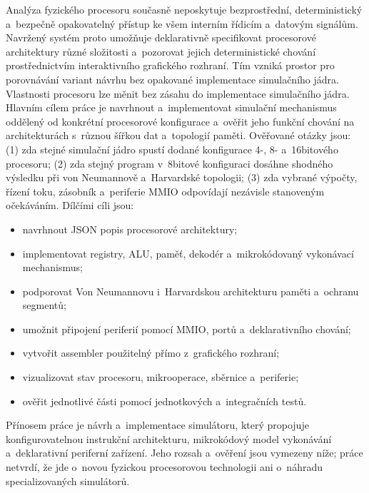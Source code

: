\documentclass[hidelinks, 12pt]{article}%
\begin{document}
Analýza fyzického procesoru současně neposkytuje bezprostřední, deterministický a~bezpečně opakovatelný přístup ke všem interním řídicím a~datovým signálům. Navržený systém proto umožňuje deklarativně specifikovat procesorové architektury různé složitosti a~pozorovat jejich deterministické chování prostřednictvím interaktivního grafického rozhraní. Tím vzniká prostor pro porovnávání variant návrhu bez opakované implementace simulačního jádra. Vlastnosti procesoru lze měnit bez zásahu do implementace simulačního jádra.
Hlavním cílem práce je navrhnout a~implementovat simulační mechanismus oddělený od konkrétní procesorové konfigurace a~ověřit jeho funkční chování na architekturách s~různou šířkou dat a~topologií paměti. Ověřované otázky jsou: (1) zda stejné simulační jádro spustí dodané konfigurace 4-, 8- a~16bitového procesoru; (2) zda stejný program v~8bitové konfiguraci dosáhne shodného výsledku při von Neumannově a~Harvardské topologii; (3) zda vybrané výpočty, řízení toku, zásobník a~periferie MMIO odpovídají nezávisle stanoveným očekáváním. Dílčími cíli jsou:
\begin{itemize}
\item navrhnout JSON popis procesorové architektury;
\item implementovat registry, ALU, paměť, dekodér a~mikrokódovaný vykonávací mechanismus;
\item podporovat Von Neumannovu i~Harvardskou architekturu paměti a~ochranu segmentů;
\item umožnit připojení periferií pomocí MMIO, portů a~deklarativního chování;
\item vytvořit assembler použitelný přímo z~grafického rozhraní;
\item vizualizovat stav procesoru, mikrooperace, sběrnice a~periferie;
\item ověřit jednotlivé části pomocí jednotkových a~integračních testů.
\end{itemize}

Přínosem práce je návrh a~implementace simulátoru, který propojuje konfigurovatelnou instrukční architekturu, mikrokódový model vykonávání a~deklarativní periferní zařízení. Jeho rozsah a~ověření jsou vymezeny níže; práce netvrdí, že jde o~novou fyzickou procesorovou technologii ani o~náhradu specializovaných simulátorů.
\end{document}
